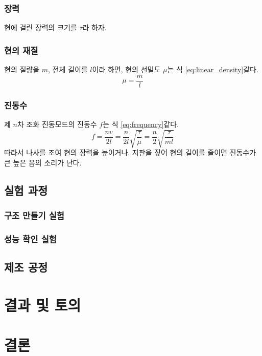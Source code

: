 \documentclass[10pt]{gshs-report-v2.0}
\begin{document}
\subsubsection{장력}
현에 걸린 장력의 크기를 $\tau$라 하자.


\subsubsection{현의 재질}
현의 질량을 $m$, 전체 길이를 $l$이라 하면, 현의 선밀도 $\mu$는 식 \ref{eq:linear_density}\과 같다.
\begin{equation}
    \mu = \frac{m}{l}
    \label{eq:linear_density}
\end{equation}

\subsubsection{진동수}
제 $n$차 조화 진동모드의 진동수 $f$는 식 \ref{eq:frequency}\와 같다.
\begin{equation}
    f = \frac{nv}{2l} = \frac{n}{2l}\sqrt{\frac{\tau}{\mu}}
    = \frac{n}{2}\sqrt{\frac{\tau}{m l}}
    \label{eq:frequency}
\end{equation}
따라서 나사를 조여 현의 장력을 높이거나, 지판을 짚어 현의 길이를 줄이면 진동수가 큰 높은 음의 소리가 난다.

\subsection{실험 과정}
\subsubsection{구조 만들기 실험}
\subsubsection{성능 확인 실험}

\subsection{제조 공정}

\section{결과 및 토의}

\section{결론}
\end{document}
